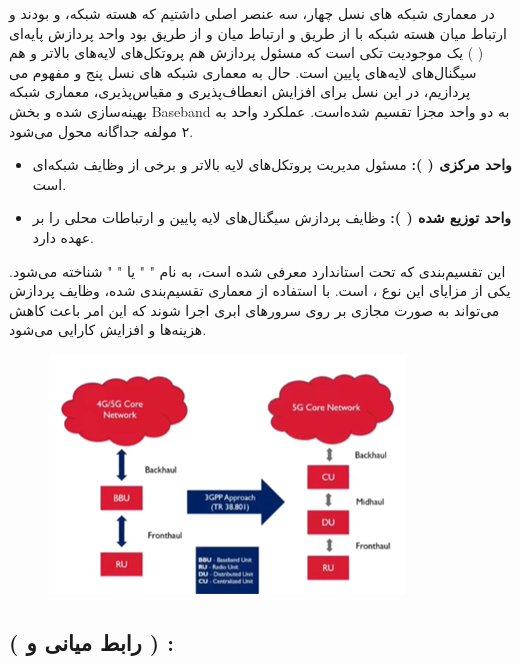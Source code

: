 \documentclass[landscape, 12pt]{report}
\begin{document}
در معماری شبکه های نسل چهار، سه عنصر اصلی داشتیم که هسته شبکه،
  و
    بودند و ارتباط میان هسته شبکه با
      از طریق
        و ارتباط میان
         و
          از طریق
            بود  واحد پردازش پایه‌ای
             (
             ) یک موجودیت تکی است که مسئول پردازش هم پروتکل‌های لایه‌های بالاتر و هم سیگنال‌های لایه‌های پایین است. 
حال به معماری شبکه های نسل پنج و مفهوم
  می پردازیم، در این نسل برای افزایش انعطاف‌پذیری و مقیاس‌پذیری، معماری شبکه بهینه‌سازی شده و بخش
  \lr‌{Baseband}
   به دو واحد مجزا تقسیم شده‌است. عملکرد  واحد
     به ۲ مولفه جداگانه محول می‌شود.
\begin{itemize}
	\item 
	\textbf{واحد مرکزی (
	):}
	مسئول مدیریت پروتکل‌های لایه بالاتر و برخی از وظایف شبکه‌ای است.
	\item 
\textbf{واحد توزیع شده (
	):}
	وظایف پردازش سیگنال‌های لایه پایین و ارتباطات محلی را بر عهده دارد.
\end{itemize}
این تقسیم‌بندی که تحت استاندارد
  معرفی شده است، به نام "
  " یا
"
" شناخته می‌شود.
یکی از مزایای این نوع
 ،
  است. با استفاده از معماری تقسیم‌بندی شده، وظایف پردازش می‌تواند به صورت مجازی بر روی سرورهای ابری اجرا شوند که این امر باعث کاهش هزینه‌ها و افزایش کارایی می‌شود.

\begin{figure}[ht]
	\centering
	\includegraphics[width=.6\linewidth]{Pic/RU_CU_DU_Splits}
	\caption{}
	\label{fig:RU_CU_DU_Splits}
\end{figure}

\subsection*{
	 (
	  رابط میانی
	    و
	  ) :}
	  
\end{document}
